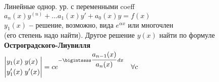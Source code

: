 \documentclass[11pt,a4paper]{article}
\newcommand{\romannum}[1]{\MakeUppercase{\romannumeral #1}}
\newcommand{\bfend}{\textbf{--} }
\begin{document}
{{}
\vspace{0.5em}

{\centering %
\scalebox{1.8}{\romannum{2$'$}.} Линейные однор. ур. с переменными coeff\\
$a_n(x) y^{(n)} +\ldots a_1(x) y' + a_0(x) y = f(x)$\\
$y_1(x)$ \bfend решение, возможно, вида $e^{\alpha x}$ или многочлен\\ (его степень надо найти). Другое решение $y(x)$ найти по
формуле {\bf Остроградского-Лиувилля}\\
$\left|\begin{aligned}y_1(x)\;& y(x)\\y'_1(x)\;& y'(x)\end{aligned}\right| = ce^{-\bigintssss \cfrac{a_{n-1}(x)}{a_n(x)}\, dx} \quad \forall c$\\
}\vspace{0.5em}

}\vrule{} %
\end{document}
